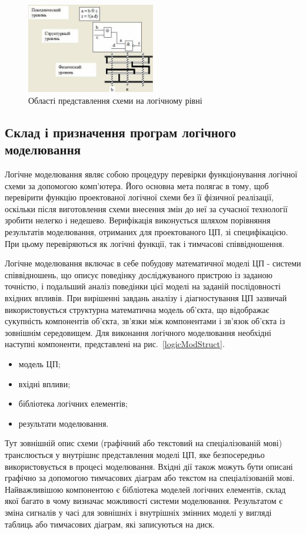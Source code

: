 \documentclass[12pt,a4paper]{article}
\begin{document}
\begin{figure}[h]
  \centering
    \includegraphics[width=0.5\textwidth]{01_02.jpg}
  \caption{Області представлення схеми на логічному рівні\label{logicLvl}}
\end{figure}

\subsection{Склад і призначення програм логічного моделювання}

Логічне моделювання являє собою процедуру перевірки функціонування логічної схеми за допомогою комп'ютера. Його основна мета полягає в тому, щоб перевірити функцію проектованої логічної схеми без її фізичної реалізації, оскільки після виготовлення схеми внесення змін до неї за сучасної технології зробити нелегко і недешево. Верифікація виконується шляхом порівняння результатів моделювання, отриманих для проектованого ЦП, зі специфікацією. При цьому перевіряються як логічні функції, так і тимчасові співвідношення.

Логічне моделювання включає в себе побудову математичної моделі ЦП - системи співвідношень, що описує поведінку досліджуваного пристрою із заданою точністю, і подальший аналіз поведінки цієї моделі на заданій послідовності вхідних впливів. При вирішенні завдань аналізу і діагностування ЦП зазвичай використовується структурна математична модель об'єкта, що відображає сукупність компонентів об'єкта, зв'язки між компонентами і зв'язок об'єкта із зовнішнім середовищем. Для виконання логічного моделювання необхідні наступні компоненти, представлені на рис.~\ref{logicModStruct}.
\begin{itemize}
  \item модель ЦП;
  \item вхідні впливи;
  \item бібліотека логічних елементів;
  \item результати моделювання.
\end{itemize}
Тут зовнішній опис схеми (графічний або текстовий на спеціалізованій мові) транслюється у внутрішнє представлення моделі ЦП, яке безпосередньо використовується в процесі моделювання. Вхідні дії також можуть бути описані графічно за допомогою тимчасових діаграм або текстом на спеціалізованій мові. Найважливішою компонентою є бібліотека моделей логічних елементів, склад якої багато в чому визначає можливості системи моделювання. Результатом є зміна сигналів у часі для зовнішніх і внутрішніх змінних моделі у вигляді таблиць або тимчасових діаграм, які записуються на диск.
\end{document}
